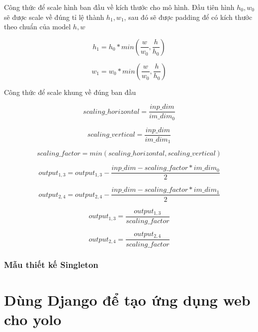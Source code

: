 Công thức để scale hình ban đầu về  kích thước cho mô hình. Đầu tiên hình $h_0, w_0$ sẽ được scale về đúng tỉ lệ thành $h_1, w_1$, sau đó sẽ được padding để có kích thước theo chuẩn của model $h, w$

\begin{equation}
    h_1 = h_0 * min(\frac{w}{w_0}, \frac{h}{h_0})   
\end{equation}

\begin{equation}
    w_1 = w_0 * min(\frac{w}{w_0}, \frac{h}{h_0})   
\end{equation}

Công thức để scale khung về đúng ban đầu 

\begin{equation}
    scaling\_horizontal = \frac{inp\_dim}{im\_dim_0}  
\end{equation}

\begin{equation}
    scaling\_vertical = \frac{inp\_dim}{im\_dim_1}
\end{equation}

\begin{equation}
    scaling\_factor = min(scaling\_horizontal, scaling\_vertical)
\end{equation}


\begin{equation}
    output_{1,3} = output_{1,3} - \frac{inp\_dim - scaling\_factor * im\_dim_0 }{2} 
\end{equation}

\begin{equation}
    output_{2,4} = output_{2,4} - \frac{inp\_dim - scaling\_factor * im\_dim_1 }{2} 
\end{equation}

\begin{equation}
    output_{1,3} = \frac{output_{1,3}}{scaling\_factor}  
\end{equation}

\begin{equation}
    output_{2,4} = \frac{output_{2,4}}{scaling\_factor}  
\end{equation}

\subsubsection{Mẫu thiết kế Singleton}



\section{Dùng Django để tạo ứng dụng web cho yolo}





